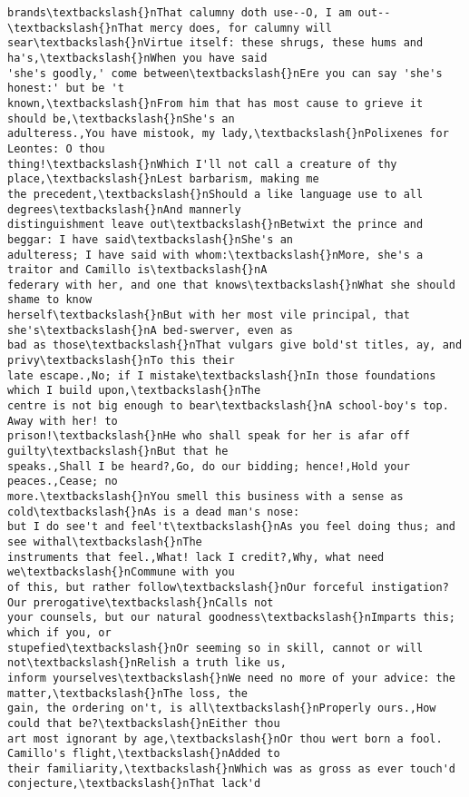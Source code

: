 \documentclass[11pt]{article}
\begin{document}
\begin{tcolorbox}[breakable, size=fbox, boxrule=.5pt, pad at break*=1mm, opacityfill=0]
\begin{Verbatim}[commandchars=\\\{\}]
brands\textbackslash{}nThat calumny doth use--O, I am out--\textbackslash{}nThat mercy does, for calumny will
sear\textbackslash{}nVirtue itself: these shrugs, these hums and ha's,\textbackslash{}nWhen you have said
'she's goodly,' come between\textbackslash{}nEre you can say 'she's honest:' but be 't
known,\textbackslash{}nFrom him that has most cause to grieve it should be,\textbackslash{}nShe's an
adulteress.,You have mistook, my lady,\textbackslash{}nPolixenes for Leontes: O thou
thing!\textbackslash{}nWhich I'll not call a creature of thy place,\textbackslash{}nLest barbarism, making me
the precedent,\textbackslash{}nShould a like language use to all degrees\textbackslash{}nAnd mannerly
distinguishment leave out\textbackslash{}nBetwixt the prince and beggar: I have said\textbackslash{}nShe's an
adulteress; I have said with whom:\textbackslash{}nMore, she's a traitor and Camillo is\textbackslash{}nA
federary with her, and one that knows\textbackslash{}nWhat she should shame to know
herself\textbackslash{}nBut with her most vile principal, that she's\textbackslash{}nA bed-swerver, even as
bad as those\textbackslash{}nThat vulgars give bold'st titles, ay, and privy\textbackslash{}nTo this their
late escape.,No; if I mistake\textbackslash{}nIn those foundations which I build upon,\textbackslash{}nThe
centre is not big enough to bear\textbackslash{}nA school-boy's top. Away with her! to
prison!\textbackslash{}nHe who shall speak for her is afar off guilty\textbackslash{}nBut that he
speaks.,Shall I be heard?,Go, do our bidding; hence!,Hold your peaces.,Cease; no
more.\textbackslash{}nYou smell this business with a sense as cold\textbackslash{}nAs is a dead man's nose:
but I do see't and feel't\textbackslash{}nAs you feel doing thus; and see withal\textbackslash{}nThe
instruments that feel.,What! lack I credit?,Why, what need we\textbackslash{}nCommune with you
of this, but rather follow\textbackslash{}nOur forceful instigation? Our prerogative\textbackslash{}nCalls not
your counsels, but our natural goodness\textbackslash{}nImparts this; which if you, or
stupefied\textbackslash{}nOr seeming so in skill, cannot or will not\textbackslash{}nRelish a truth like us,
inform yourselves\textbackslash{}nWe need no more of your advice: the matter,\textbackslash{}nThe loss, the
gain, the ordering on't, is all\textbackslash{}nProperly ours.,How could that be?\textbackslash{}nEither thou
art most ignorant by age,\textbackslash{}nOr thou wert born a fool. Camillo's flight,\textbackslash{}nAdded to
their familiarity,\textbackslash{}nWhich was as gross as ever touch'd conjecture,\textbackslash{}nThat lack'd

\end{Verbatim}
\end{tcolorbox}
\end{document}

